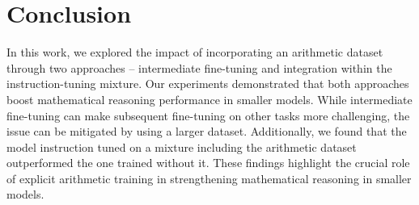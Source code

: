 \section{Conclusion}
In this work, we explored the impact of incorporating an arithmetic dataset through two approaches -- intermediate fine-tuning and integration within the instruction-tuning mixture. Our experiments demonstrated that both approaches boost mathematical reasoning performance in smaller models. While intermediate fine-tuning can make subsequent fine-tuning on other tasks more challenging, the issue can be mitigated by using a larger dataset. Additionally, we found that the model instruction tuned on a mixture including the arithmetic dataset outperformed the one trained without it. These findings highlight the crucial role of explicit arithmetic training in strengthening mathematical reasoning in smaller models.

